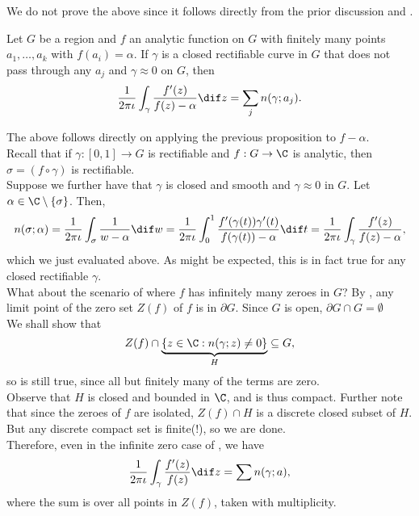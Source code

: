 		We do not prove the above since it follows directly from the prior discussion and .

		\begin{corollary}
			\label{cor 2.38}
			Let $G$ be a region and $f$ an analytic function on $G$ with finitely many points $a_1,\ldots,a_k$ with $f(a_i) = \alpha$. If $\gamma$ is a closed rectifiable curve in $G$ that does not pass through any $a_j$ and $\gamma \approx 0$ on $G$, then
			\[ \frac{1}{2\pi\iota} \int_\gamma \frac{f'(z)}{f(z)-\alpha} \dif z = \sum_j n(\gamma;a_j). \]
		\end{corollary}

		The above follows directly on applying the previous proposition to $f-\alpha$.\\

		Recall that if $\gamma:[0,1] \to G$ is rectifiable and $f:G\to\C$ is analytic, then $\sigma = (f\circ\gamma)$ is rectifiable. \\
		Suppose we further have that $\gamma$ is closed and smooth and $\gamma \approx 0$ in $G$. Let $\alpha \in \C \setminus \{\sigma\}$. Then,
		\[ n(\sigma;\alpha) = \frac{1}{2\pi\iota} \int_\sigma \frac{1}{w-\alpha} \dif w = \frac{1}{2\pi\iota} \int_0^1 \frac{f'(\gamma(t))\gamma'(t)}{f(\gamma(t)) - \alpha} \dif t = \frac{1}{2\pi\iota} \int_\gamma \frac{f'(z)}{f(z)-\alpha}, \]
		which we just evaluated above. As might be expected, this is in fact true for any closed rectifiable $\gamma$.\\

		What about the scenario of  where $f$ has infinitely many zeroes in $G$? By , any limit point of the zero set $Z(f)$ of $f$ is in $\partial G$. Since $G$ is open, $\partial G \cap G = \emptyset$\\
		We shall show that
		\[ Z(f) \cap \underbrace{\{ z \in \C : n(\gamma;z) \ne 0 \}}_{H} \subseteq G, \]
		so  is still true, since all but finitely many of the terms are zero.\\
		Observe that $H$ is closed and bounded in $\C$, and is thus compact. Further note that since the zeroes of $f$ are isolated, $Z(f) \cap H$ is a discrete closed subset of $H$. But any discrete compact set is finite(!), so we are done.\\
		Therefore, even in the infinite zero case of , we have
		\[ \frac{1}{2\pi\iota} \int_\gamma \frac{f'(z)}{f(z)} \dif z = \sum n(\gamma;a), \]
		where the sum is over all points in $Z(f)$, taken with multiplicity.


